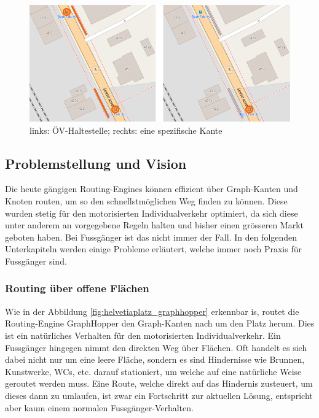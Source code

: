 \begin{figure}[ht]
\centering
\includegraphics[width=0.7\linewidth]{technicalreport/img/public_transport_stop}
\caption[Unterschied ÖV-Haltestelle und Kante]{links: ÖV-Haltestelle; rechts: eine spezifische Kante}
\label{fig:public_transport_stop}
\end{figure}


\subsection{Problemstellung und Vision}
\label{Problemstellung und Vision}
Die heute gängigen Routing-Engines können effizient über Graph-Kanten und Knoten routen, um so den schnellstmöglichen Weg finden zu können. Diese wurden stetig für den motorisierten Individualverkehr optimiert, da sich diese unter anderem an vorgegebene Regeln halten und bisher einen grösseren Markt geboten haben. Bei Fussgänger ist das nicht immer der Fall. In den folgenden Unterkapiteln werden einige Probleme erläutert, welche immer noch Praxis für Fussgänger sind.

\subsubsection{Routing über offene Flächen}
\label{problem:Routing über offene Flächen}
Wie in der Abbildung \ref{fig:helvetiaplatz_graphhopper} erkennbar is, routet die Routing-Engine GraphHopper \cite{graphhopper} den Graph-Kanten nach um den Platz herum. Dies ist ein natürliches Verhalten für den motorisierten Individualverkehr. Ein Fussgänger hingegen nimmt den direkten Weg über Flächen. Oft handelt es sich dabei nicht nur um eine leere Fläche, sondern es sind Hindernisse wie Brunnen, Kunstwerke, WCs, etc. darauf stationiert, um welche auf eine natürliche Weise geroutet werden muss. Eine Route, welche direkt auf das Hindernis zusteuert, um dieses dann zu umlaufen, ist zwar ein Fortschritt zur aktuellen Lösung, entspricht aber kaum einem normalen Fussgänger-Verhalten. 

